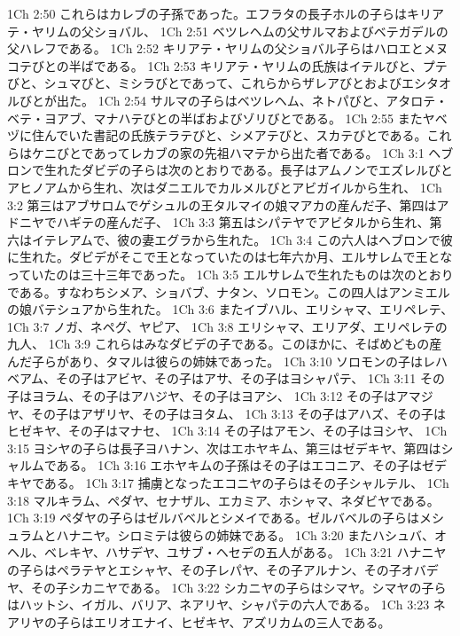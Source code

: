 1Ch 2:50  これらはカレブの子孫であった。エフラタの長子ホルの子らはキリアテ・ヤリムの父ショバル、
1Ch 2:51  ベツレヘムの父サルマおよびベテガデルの父ハレフである。
1Ch 2:52  キリアテ・ヤリムの父ショバル子らはハロエとメヌコテびとの半ばである。
1Ch 2:53  キリアテ・ヤリムの氏族はイテルびと、プテびと、シュマびと、ミシラびとであって、これらからザレアびとおよびエシタオルびとが出た。
1Ch 2:54  サルマの子らはベツレヘム、ネトパびと、アタロテ・ベテ・ヨアブ、マナハテびとの半ばおよびゾリびとである。
1Ch 2:55  またヤベヅに住んでいた書記の氏族テラテびと、シメアテびと、スカテびとである。これらはケニびとであってレカブの家の先祖ハマテから出た者である。
1Ch 3:1  ヘブロンで生れたダビデの子らは次のとおりである。長子はアムノンでエズレルびとアヒノアムから生れ、次はダニエルでカルメルびとアビガイルから生れ、
1Ch 3:2  第三はアブサロムでゲシュルの王タルマイの娘マアカの産んだ子、第四はアドニヤでハギテの産んだ子、
1Ch 3:3  第五はシパテヤでアビタルから生れ、第六はイテレアムで、彼の妻エグラから生れた。
1Ch 3:4  この六人はヘブロンで彼に生れた。ダビデがそこで王となっていたのは七年六か月、エルサレムで王となっていたのは三十三年であった。
1Ch 3:5  エルサレムで生れたものは次のとおりである。すなわちシメア、ショバブ、ナタン、ソロモン。この四人はアンミエルの娘バテシュアから生れた。
1Ch 3:6  またイブハル、エリシャマ、エリペレテ、
1Ch 3:7  ノガ、ネペグ、ヤピア、
1Ch 3:8  エリシャマ、エリアダ、エリペレテの九人、
1Ch 3:9  これらはみなダビデの子である。このほかに、そばめどもの産んだ子らがあり、タマルは彼らの姉妹であった。
1Ch 3:10  ソロモンの子はレハベアム、その子はアビヤ、その子はアサ、その子はヨシャパテ、
1Ch 3:11  その子はヨラム、その子はアハジヤ、その子はヨアシ、
1Ch 3:12  その子はアマジヤ、その子はアザリヤ、その子はヨタム、
1Ch 3:13  その子はアハズ、その子はヒゼキヤ、その子はマナセ、
1Ch 3:14  その子はアモン、その子はヨシヤ、
1Ch 3:15  ヨシヤの子らは長子ヨハナン、次はエホヤキム、第三はゼデキヤ、第四はシャルムである。
1Ch 3:16  エホヤキムの子孫はその子はエコニア、その子はゼデキヤである。
1Ch 3:17  捕虜となったエコニヤの子らはその子シャルテル、
1Ch 3:18  マルキラム、ペダヤ、セナザル、エカミア、ホシャマ、ネダビヤである。
1Ch 3:19  ペダヤの子らはゼルバベルとシメイである。ゼルバベルの子らはメシュラムとハナニヤ。シロミテは彼らの姉妹である。
1Ch 3:20  またハシュバ、オヘル、ベレキヤ、ハサデヤ、ユサブ・ヘセデの五人がある。
1Ch 3:21  ハナニヤの子らはペラテヤとエシャヤ、その子レパヤ、その子アルナン、その子オバデヤ、その子シカニヤである。
1Ch 3:22  シカニヤの子らはシマヤ。シマヤの子らはハットシ、イガル、バリア、ネアリヤ、シャパテの六人である。
1Ch 3:23  ネアリヤの子らはエリオエナイ、ヒゼキヤ、アズリカムの三人である。
